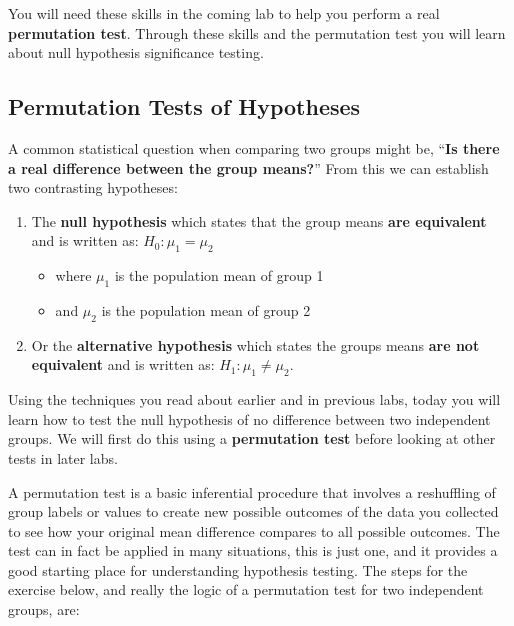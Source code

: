 \documentclass[]{book}
\providecommand{\tightlist}{%
  \setlength{\itemsep}{0pt}\setlength{\parskip}{0pt}}
\begin{document}
You will need these skills in the coming lab to help you perform a real \textbf{permutation test}. Through these skills and the permutation test you will learn about null hypothesis significance testing.

\hypertarget{permutation-tests-of-hypotheses}{%
\subsection{Permutation Tests of Hypotheses}\label{permutation-tests-of-hypotheses}}

A common statistical question when comparing two groups might be, ``\textbf{Is there a real difference between the group means?}'' From this we can establish two contrasting hypotheses:

\begin{enumerate}
\def\labelenumi{\arabic{enumi}.}
\tightlist
\item
  The \textbf{null hypothesis} which states that the group means \textbf{are equivalent} and is written as: \(H_0: \mu_1 = \mu_2\)

  \begin{itemize}
  \tightlist
  \item
    where \(\mu_1\) is the population mean of group 1
  \item
    and \(\mu_2\) is the population mean of group 2\\
  \end{itemize}
\item
  Or the \textbf{alternative hypothesis} which states the groups means \textbf{are not equivalent} and is written as: \(H_1: \mu_1 \ne \mu_2\).
\end{enumerate}

Using the techniques you read about earlier and in previous labs, today you will learn how to test the null hypothesis of no difference between two independent groups. We will first do this using a \textbf{permutation test} before looking at other tests in later labs.

A permutation test is a basic inferential procedure that involves a reshuffling of group labels or values to create new possible outcomes of the data you collected to see how your original mean difference compares to all possible outcomes. The test can in fact be applied in many situations, this is just one, and it provides a good starting place for understanding hypothesis testing. The steps for the exercise below, and really the logic of a permutation test for two independent groups, are:
\end{document}
